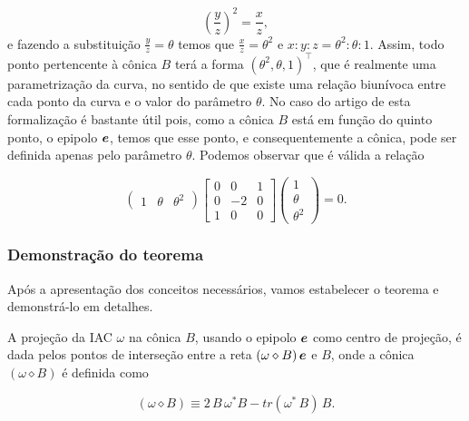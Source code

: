 \begin{equation*}
\left(\frac{y}{z}\right)^2=\frac{x}{z},
\end{equation*}
e fazendo a substituição $\displaystyle{\frac{y}{z}=\theta}$ temos que $\displaystyle{\frac{x}{z}=\theta^2}$ e $x:y:z=\theta^2:\theta:1$.
Assim, todo ponto pertencente à cônica $B$ terá a forma $(\theta^2,\theta,1)^\top$, que é realmente uma parametrização da curva, no sentido de que existe uma relação biunívoca entre cada ponto da curva e o valor do parâmetro $\theta$. No caso do artigo de \citep{2503343} esta formalização é bastante útil pois, como a cônica $B$ está em função do quinto ponto, o epipolo $\boldsymbol{e}$, temos que esse ponto, e consequentemente a cônica, pode ser definida apenas pelo parâmetro $\theta$. Podemos observar que é válida a relação

\begin{equation*}
\begin{pmatrix}
1&\theta&\theta^2
\end{pmatrix}
\begin{bmatrix}
0&0&1\\
0&-2&0\\
1&0&0
\end{bmatrix}
\begin{pmatrix}
1\\
\theta\\
\theta^2
\end{pmatrix}
=0.
\end{equation*}


\subsubsection{Demonstração do teorema}

Após a apresentação dos conceitos necessários, vamos estabelecer o teorema e demonstrá-lo em detalhes.

\begin{teorema}
A projeção da IAC $\omega$ na cônica $B$, usando o epipolo $\boldsymbol{e}$ como centro de projeção, é dada pelos pontos de interseção entre a reta $(\omega\diamond B)\,\boldsymbol{e}$ e $B$, onde a cônica $(\omega\diamond B)$ é definida como

\begin{equation}\label{eq.conica-diamond}
(\omega \diamond B)\equiv 2\,B\,\omega^*B - tr(\omega^*\,B)\,B.
\end{equation}
\end{teorema}


